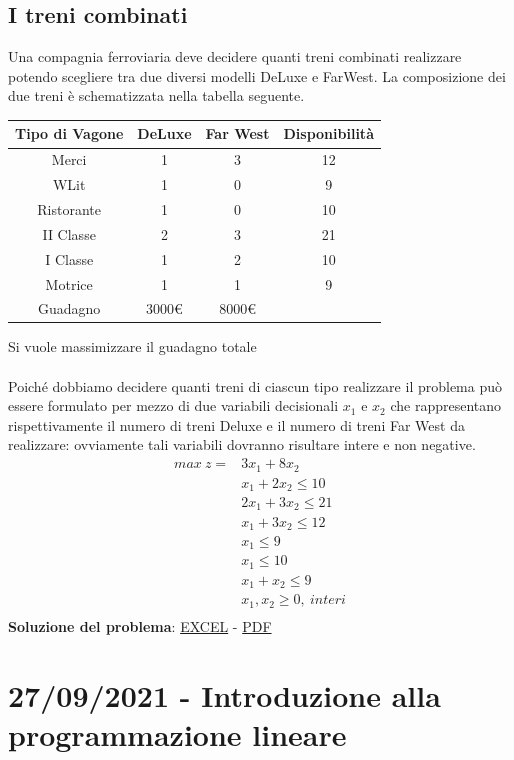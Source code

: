 \documentclass[12pt,a4paper]{article}
\begin{document}
\subsection{I treni combinati}
Una compagnia ferroviaria deve decidere quanti treni combinati realizzare potendo scegliere tra due diversi modelli DeLuxe e FarWest. La composizione dei due treni è schematizzata nella tabella seguente.\\
\begin{center}
\begin{tabular}{|c|c|c|c|}
\hline
Tipo di Vagone & DeLuxe & Far West & Disponibilità\\
\hline
Merci & 1 & 3 & 12\\
WLit & 1 &0 & 9\\
Ristorante & 1 & 0 & 10\\
II Classe &2 &3 & 21\\
I Classe &1& 2 & 10\\
Motrice &1 &1 & 9\\
\hline
Guadagno & 3000€ & 8000€ & \\
\hline
\end{tabular}
\end{center}
Si vuole massimizzare il guadagno totale\\
\\
Poiché dobbiamo decidere quanti treni di ciascun tipo realizzare il problema può essere formulato per mezzo di due variabili
decisionali $x_1$ e $x_2$ che rappresentano rispettivamente il numero di treni Deluxe e il numero di treni Far West da realizzare: ovviamente tali variabili dovranno risultare intere e non negative.\\
$$\begin{array}{cl}
max \ z = & 3x_1+8x_2\\
& x_1+2x_2 \leq 10\\
& 2x_1+3x_2 \leq 21\\
& x_1+3x_2 \leq 12\\
& x_1 \leq 9\\
& x_1 \leq 10\\
& x_1 + x_2 \leq 9\\
& x_1,x_2 \geq 0, \ interi\\
\end{array}$$
\noindent
\textbf{Soluzione del problema}: \href{https://units.enricolacchin.com/ricop21/treni_combinati.xlsx}{EXCEL} - \href{https://units.enricolacchin.com/ricop21/treni_combinati.xlsx}{PDF}

\clearpage
\section{27/09/2021 - Introduzione alla programmazione lineare}
\end{document}

